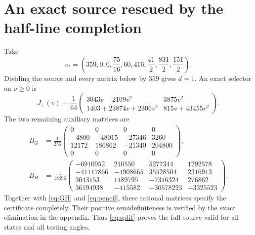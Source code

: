 \documentclass[11pt]{article}
\begin{document}
\clearpage
\section{An exact source rescued by the half-line completion}

Take
\[
 c_* =\left(359,0,0,\frac{75}{16},60,416,
                   \frac{41}{2},\frac{831}{2},\frac{151}{2}\right).
\]
Dividing the source and every matrix below by $359$ gives $d=1$.
An exact selector on $v\ge0$ is
\begin{equation}
 J_+(v)=\frac1{64}\begin{pmatrix}
 3043v-2109v^2&3875v^2\\
 1403+23874v+2306v^2&815v+43455v^2
 \end{pmatrix}.                                           \label{eq:witnessJ}
\end{equation}
The two remaining auxiliary matrices are
\begin{align}
 B_G&=\frac1{256}\begin{pmatrix}
 0&0&0&0\\-4800&-48015&-27346&3260\\
 12172&186862&-21340&204800\\0&0&0&0
 \end{pmatrix},                                           \label{eq:witnessBG}\\
 B_H&=\frac1{18496}\begin{pmatrix}
 -6910952&240550&5277344&1292578\\
 -41117866&-4908665&35528504&2316913\\
 3043153&1489795&-7316324&276862\\
 36194938&-415582&-30578223&-3325523
 \end{pmatrix}.                                           \label{eq:witnessBH}
\end{align}
Together with \eqref{eq:GH} and \eqref{eq:pencil}, these rational matrices
specify the certificate completely. Their positive semidefiniteness is
verified by the exact elimination in the appendix. Thus \eqref{eq:split}
proves the full source valid for all states and all testing angles.
\end{document}
